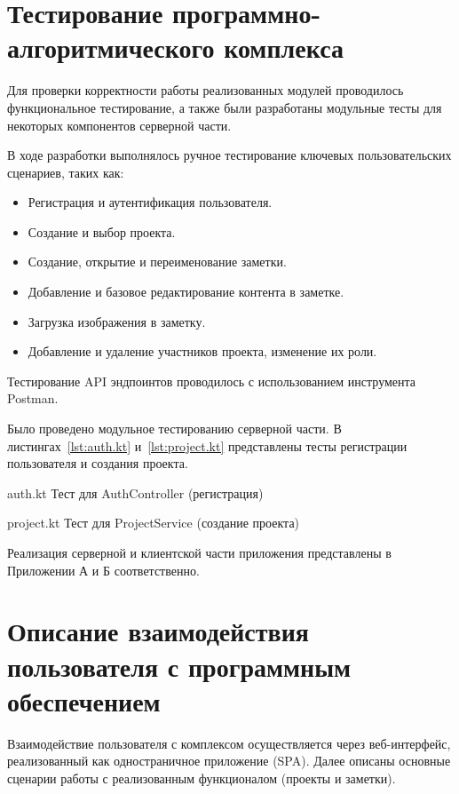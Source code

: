 \section{Тестирование программно-алгоритмического комплекса}

Для проверки корректности работы реализованных модулей проводилось функциональное тестирование, а также были разработаны модульные тесты для некоторых компонентов серверной части.

В ходе разработки выполнялось ручное тестирование ключевых пользовательских сценариев, таких как:
\begin{itemize}
    \item Регистрация и аутентификация пользователя.
    \item Создание и выбор проекта.
    \item Создание, открытие и переименование заметки.
    \item Добавление и базовое редактирование контента в заметке.
    \item Загрузка изображения в заметку.
    \item Добавление и удаление участников проекта, изменение их роли.
\end{itemize}
Тестирование API эндпоинтов проводилось с использованием инструмента Postman.

Было проведено модульное тестированию серверной части. 
В листингах~\ref{lst:auth.kt} и~\ref{lst:project.kt} представлены тесты регистрации пользователя и создания проекта. 

\clearpage
{}
	{auth.kt}
	{Тест для AuthController (регистрация)}

\clearpage
{}
	{project.kt}
	{Тест для ProjectService (создание проекта)}

\clearpage
Реализация серверной и клиентской части приложения представлены в Приложении А и Б соответственно.

\section{Описание взаимодействия пользователя с программным обеспечением}

Взаимодействие пользователя с комплексом осуществляется через веб-интерфейс, реализованный как одностраничное приложение (SPA). 
Далее описаны основные сценарии работы с реализованным функционалом (проекты и заметки).

